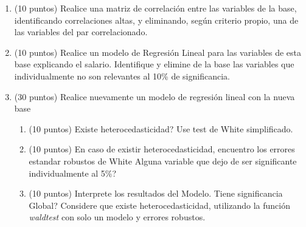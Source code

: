 \documentclass[letterpaper,11pt]{article}
\begin{document}
\begin{enumerate}

    \item (10 puntos) Realice una matriz de correlación entre las variables de la base, identificando correlaciones altas, y eliminando, según criterio propio, una de las variables del par correlacionado.

\item (10 puntos) Realice un modelo de Regresión Lineal para las variables de esta base explicando el salario. Identifique y elimine de la base las variables que individualmente no son relevantes al 10\% de significancia.  



   \item (30 puntos) Realice nuevamente un modelo de regresión lineal con la nueva base 
    \begin{enumerate}
        \item  (10 puntos) \textquestiondown Existe heterocedasticidad? Use test de White simplificado.

        \item (10 puntos) En caso de existir heterocedasticidad, encuentro los errores estandar robustos de White \textquestiondown Alguna variable que dejo de ser significante individualmente al 5\%?

                \item (10 puntos) Interprete los resultados del Modelo. \textquestiondown Tiene significancia Global? Considere que existe heterocedasticidad, utilizando la función \textit{waldtest} con solo un modelo y errores robustos. 
        
    \end{enumerate} 

\end{enumerate}
\end{document}
